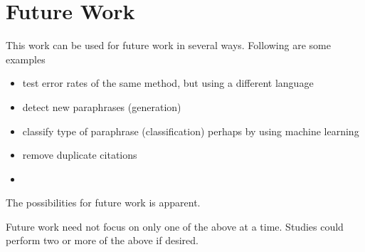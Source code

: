 \section {Future Work}
This work can be used for future work in several ways. Following are some examples 
	\begin {itemize}
		\item test error rates of the same method, but using a different language
		\item detect new paraphrases (generation)
		\item classify type of paraphrase (classification) perhaps by using machine learning
		\item remove duplicate citations
		\item [Insert more here]
	\end {itemize}
The possibilities for future work is apparent. 

Future work need not focus on only one of the above at a time.  Studies could perform two or more of the above if desired. 

